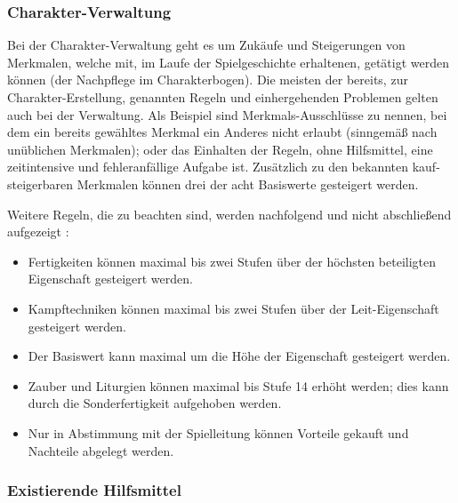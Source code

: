 \subsubsection{Charakter-Verwaltung}
\label{subsubsec:charakter-verwaltung}

Bei der Charakter-Verwaltung geht es um Zukäufe und Steigerungen von Merkmalen, welche mit, im Laufe der Spielgeschichte erhaltenen,  getätigt werden können (\inkl der Nachpflege im Charakterbogen).
Die meisten der bereits, zur Charakter-Erstellung, genannten Regeln und einhergehenden Problemen gelten auch bei der Verwaltung.
Als Beispiel sind Merkmals-Ausschlüsse zu nennen, bei dem ein bereits gewähltes Merkmal ein Anderes nicht erlaubt (sinngemäß nach unüblichen Merkmalen);
oder das Einhalten der Regeln, ohne Hilfsmittel, eine zeitintensive und fehleranfällige Aufgabe ist.
Zusätzlich zu den bekannten kauf- \bzw steigerbaren Merkmalen können drei der acht Basiswerte gesteigert werden.

Weitere Regeln, die zu beachten sind, werden nachfolgend und nicht abschließend aufgezeigt :
\begin{itemize}
    \item Fertigkeiten können maximal bis zwei Stufen über der höchsten beteiligten Eigenschaft gesteigert werden.
    \item Kampftechniken können maximal bis zwei Stufen über der Leit-Eigenschaft gesteigert werden.
    \item Der Basiswert  kann maximal um die Höhe der Eigenschaft  gesteigert werden.
    \item Zauber und Liturgien können maximal bis Stufe 14 erhöht werden; dies kann durch die Sonderfertigkeit  \bzw {} aufgehoben werden.
    \item Nur in Abstimmung mit der Spielleitung können Vorteile gekauft und Nachteile abgelegt werden.
\end{itemize}


\subsubsection{Existierende Hilfsmittel}
\label{subsubsec:existierende-hilftmittel}

